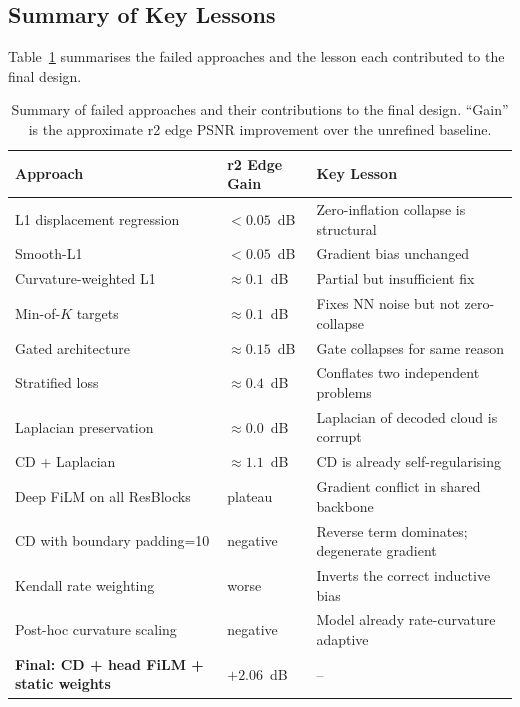\subsection{Summary of Key Lessons}

Table~\ref{tab:failed-approaches} summarises the failed approaches and the
lesson each contributed to the final design.

\begin{table}[t]
  \centering
  \caption{%
    Summary of failed approaches and their contributions to the final design.
    ``Gain'' is the approximate r2 edge PSNR improvement over the unrefined baseline.
  }
  \label{tab:failed-approaches}
  \small
  \begin{tabular}{llp{5.5cm}}
    \toprule
    \textbf{Approach} & \textbf{r2 Edge Gain} & \textbf{Key Lesson} \\
    \midrule
    L1 displacement regression & $< 0.05$~dB & Zero-inflation collapse is structural \\
    Smooth-L1 & $< 0.05$~dB & Gradient bias unchanged \\
    Curvature-weighted L1 & $\approx 0.1$~dB & Partial but insufficient fix \\
    Min-of-$K$ targets & $\approx 0.1$~dB & Fixes NN noise but not zero-collapse \\
    Gated architecture & $\approx 0.15$~dB & Gate collapses for same reason \\
    Stratified loss & $\approx 0.4$~dB & Conflates two independent problems \\
    Laplacian preservation & $\approx 0.0$~dB & Laplacian of decoded cloud is corrupt \\
    CD + Laplacian & $\approx 1.1$~dB & CD is already self-regularising \\
    Deep FiLM on all ResBlocks & plateau & Gradient conflict in shared backbone \\
    CD with boundary padding=10 & negative & Reverse term dominates; degenerate gradient \\
    Kendall rate weighting & worse & Inverts the correct inductive bias \\
    Post-hoc curvature scaling & negative & Model already rate-curvature adaptive \\
    \midrule
    \textbf{Final: CD + head FiLM + static weights} & $\mathbf{+2.06}$~dB & -- \\
    \bottomrule
  \end{tabular}
\end{table}

